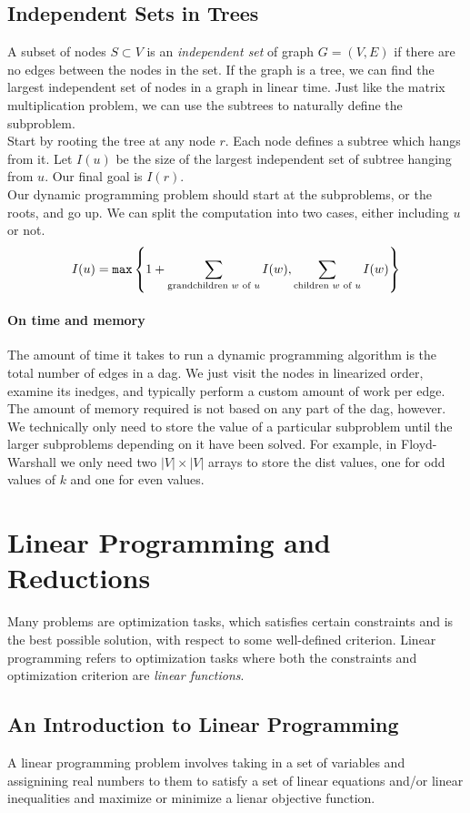 \subsection{Independent Sets in Trees}
A subset of nodes $S \subset V$ is an \textit{independent set} of graph $G = (V, E)$ if there are no edges between the nodes in the set.
If the graph is a tree, we can find the largest independent set of nodes in a graph in linear time.
Just like the matrix multiplication problem, we can use the subtrees to naturally define the subproblem.\\
Start by rooting the tree at any node $r$.
Each node defines a subtree which hangs from it.
Let $I(u)$ be the size of the largest independent set of subtree hanging from $u$.
Our final goal is $I(r)$.\\
Our dynamic programming problem should start at the subproblems, or the roots, and go up.
We can split the computation into two cases, either including $u$ or not.
$$I(u) = \verb|max|\left\{1 + \sum_{\text{grandchildren $w$ of $u$}} I(w), \sum_{\text{children $w$ of $u$}} I(w)\right\}$$

\paragraph{On time and memory}
The amount of time it takes to run a dynamic programming algorithm is the total number of edges in a dag.
We just visit the nodes in linearized order, examine its inedges, and typically perform a custom amount of work per edge.
The amount of memory required is not based on any part of the dag, however.
We technically only need to store the value of a particular subproblem until the larger subproblems depending on it have been solved.
For example, in Floyd-Warshall we only need two $|V| \times |V|$ arrays to store the dist values, one for odd values of $k$ and one for even values.

\pagebreak
\section{Linear Programming and Reductions}
Many problems are optimization tasks, which satisfies certain constraints and is the best possible solution, with respect to some well-defined criterion.
Linear programming refers to optimization tasks where both the constraints and optimization criterion are \textit{linear functions}.

\subsection{An Introduction to Linear Programming}
A linear programming problem involves taking in a set of variables and assignining real numbers to them to satisfy a set of linear equations and/or linear inequalities and maximize or minimize a lienar objective function.


